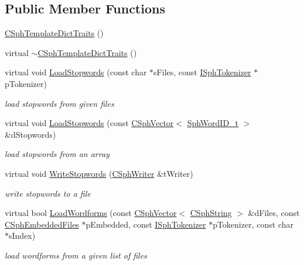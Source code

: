 \subsection*{Public Member Functions}
\begin{DoxyCompactItemize}
\item 
\hyperlink{structCSphTemplateDictTraits_ab31edad26e3ffb3c2d61f5753e48c820}{C\-Sph\-Template\-Dict\-Traits} ()
\item 
virtual \hyperlink{structCSphTemplateDictTraits_abba0ae2988eeea4b70d65b102f927cfd}{$\sim$\-C\-Sph\-Template\-Dict\-Traits} ()
\item 
virtual void \hyperlink{structCSphTemplateDictTraits_a014ada0cbd6392ee74e946879679a013}{Load\-Stopwords} (const char $\ast$s\-Files, const \hyperlink{classISphTokenizer}{I\-Sph\-Tokenizer} $\ast$p\-Tokenizer)
\begin{DoxyCompactList}\small\item\em load stopwords from given files \end{DoxyCompactList}\item 
virtual void \hyperlink{structCSphTemplateDictTraits_afb71dbc2f1f0312c84d82e89169fdd8b}{Load\-Stopwords} (const \hyperlink{classCSphVector}{C\-Sph\-Vector}$<$ \hyperlink{sphinx_8h_a80a94d5984fdf9214a98f3e5e65df963}{Sph\-Word\-I\-D\-\_\-t} $>$ \&d\-Stopwords)
\begin{DoxyCompactList}\small\item\em load stopwords from an array \end{DoxyCompactList}\item 
virtual void \hyperlink{structCSphTemplateDictTraits_a57c3b5c8e7a5a65326ae232f6e091f0a}{Write\-Stopwords} (\hyperlink{classCSphWriter}{C\-Sph\-Writer} \&t\-Writer)
\begin{DoxyCompactList}\small\item\em write stopwords to a file \end{DoxyCompactList}\item 
virtual bool \hyperlink{structCSphTemplateDictTraits_aa6b7233d177df1c0ad3b1583a95a9110}{Load\-Wordforms} (const \hyperlink{classCSphVector}{C\-Sph\-Vector}$<$ \hyperlink{structCSphString}{C\-Sph\-String} $>$ \&d\-Files, const \hyperlink{structCSphEmbeddedFiles}{C\-Sph\-Embedded\-Files} $\ast$p\-Embedded, const \hyperlink{classISphTokenizer}{I\-Sph\-Tokenizer} $\ast$p\-Tokenizer, const char $\ast$s\-Index)
\begin{DoxyCompactList}\small\item\em load wordforms from a given list of files \end{DoxyCompactList}\item 

\end{DoxyCompactItemize}
